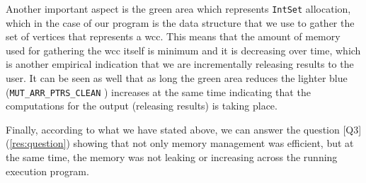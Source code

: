 Another important aspect is the green area which represents \texttt{IntSet} allocation, which in the case of our program is the data structure that we use to gather the set of vertices that represents a \acrshort{wcc}. This means that the amount of memory used for gathering the \acrshort{wcc} itself is minimum and it is decreasing over time, which is another empirical indication that we are incrementally releasing results to the user. It can be seen as well that as long the green area reduces the lighter blue (\texttt{MUT_ARR_PTRS_CLEAN} \cite{ghcheap}) increases at the same time indicating that the computations for the output (releasing results) is taking place. 

Finally, according to what we have stated above, we can answer the question [Q3] (\autoref{res:question}) showing that not only memory management was efficient, but at the same time, the memory was not leaking or increasing across the running execution program.


